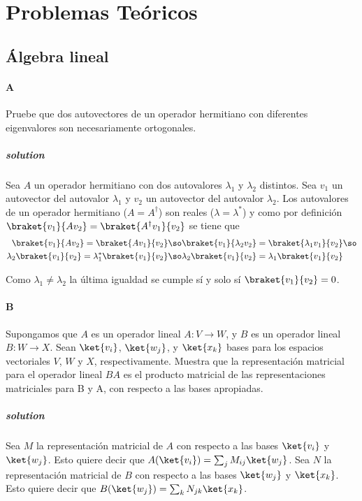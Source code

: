 
\section{Problemas Teóricos}

\subsection{Álgebra lineal}

\paragraph{A} Pruebe que dos autovectores de un operador hermitiano con diferentes eigenvalores son necesariamente ortogonales.
\subparagraph{solution}
	Sea $A$ un operador hermitiano con dos autovalores $\lambda_1$ y $\lambda_2$ distintos.
	Sea $v_{1}$ un autovector del autovalor $\lambda_1$ y $v_{2}$ un autovector del autovalor $\lambda_2$.
	Los autovalores de un operador hermitiano ($A=A^\dagger$) son reales ($\lambda=\lambda^*$) y como por definición $\braket{v_1}{Av_2}=\braket{A^\dagger v_1}{v_2}$ se tiene que
	\begin{equation*}
		\begin{split}
		\braket{v_1}{Av_2}=\braket{A v_1}{v_2}&\so\braket{v_1}{\lambda_2 v_2}=\braket{\lambda_1 v_1}{v_2}\so \\
		\lambda_2\braket{v_1}{v_2}=\lambda_1^* \braket{v_1}{v_2}&\so\lambda_2\braket{v_1}{v_2}=\lambda_1 \braket{v_1}{v_2}
		\end{split}
	\end{equation*}

Como $\lambda_1\neq\lambda_2$ la última igualdad se cumple sí y solo sí $\braket{v_1}{v_2}=0$.

\paragraph{B} Supongamos que $A$ es un operador lineal $A: V\longrightarrow W$, y $B$ es un operador lineal $B : W \longrightarrow X$.
Sean $\ket{v_i}$, $\ket{w_j}$, y $\ket{x_k}$ bases para los espacios vectoriales $V$, $W$ y $X$, respectivamente.
Muestra que la representación matricial para el operador lineal $BA$ es el producto matricial de las representaciones matriciales para B y A, con respecto a las bases apropiadas.
\subparagraph{solution}
	Sea $M$ la representación matricial de $A$ con respecto a las bases $\ket{v_i}$ y $\ket{w_j}$.
	Esto quiere decir que $A(\ket{v_i})=\sum_{j} M_{ij}\ket{w_j}$.
	Sea $N$ la representación matricial de $B$ con respecto a las bases $\ket{w_j}$ y $\ket{x_k}$.
	Esto quiere decir que $B(\ket{w_j})=\sum_{k} N_{jk}\ket{x_k}$.

